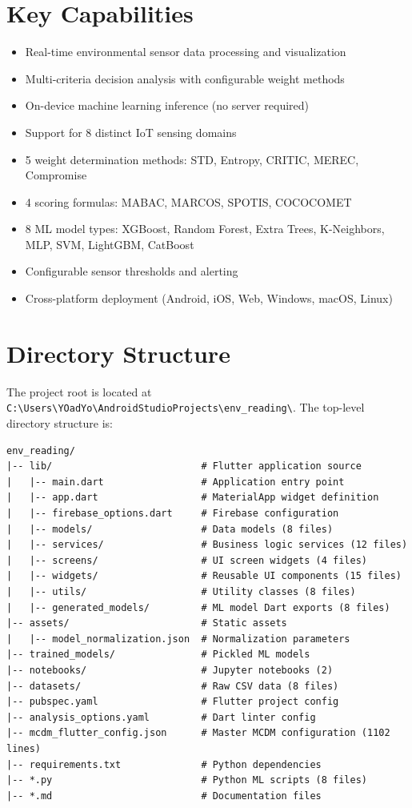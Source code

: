 \documentclass[12pt,a4paper,oneside]{report}
\begin{document}
\section{Key Capabilities}

\begin{itemize}
  \item Real-time environmental sensor data processing and visualization
  \item Multi-criteria decision analysis with configurable weight methods
  \item On-device machine learning inference (no server required)
  \item Support for 8 distinct IoT sensing domains
  \item 5 weight determination methods: STD, Entropy, CRITIC, MEREC, Compromise
  \item 4 scoring formulas: MABAC, MARCOS, SPOTIS, COCOCOMET
  \item 8 ML model types: XGBoost, Random Forest, Extra Trees, K-Neighbors, MLP, SVM, LightGBM, CatBoost
  \item Configurable sensor thresholds and alerting
  \item Cross-platform deployment (Android, iOS, Web, Windows, macOS, Linux)
\end{itemize}

\section{Directory Structure}

The project root is located at \texttt{C:\textbackslash Users\textbackslash YOadYo\textbackslash AndroidStudioProjects\textbackslash env\_reading\textbackslash}. The top-level directory structure is:

\begin{verbatim}
env_reading/
|-- lib/                          # Flutter application source
|   |-- main.dart                 # Application entry point
|   |-- app.dart                  # MaterialApp widget definition
|   |-- firebase_options.dart     # Firebase configuration
|   |-- models/                   # Data models (8 files)
|   |-- services/                 # Business logic services (12 files)
|   |-- screens/                  # UI screen widgets (4 files)
|   |-- widgets/                  # Reusable UI components (15 files)
|   |-- utils/                    # Utility classes (8 files)
|   |-- generated_models/         # ML model Dart exports (8 files)
|-- assets/                       # Static assets
|   |-- model_normalization.json  # Normalization parameters
|-- trained_models/               # Pickled ML models
|-- notebooks/                    # Jupyter notebooks (2)
|-- datasets/                     # Raw CSV data (8 files)
|-- pubspec.yaml                  # Flutter project config
|-- analysis_options.yaml         # Dart linter config
|-- mcdm_flutter_config.json      # Master MCDM configuration (1102 lines)
|-- requirements.txt              # Python dependencies
|-- *.py                          # Python ML scripts (8 files)
|-- *.md                          # Documentation files
\end{verbatim}
\end{document}
